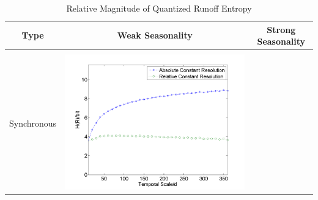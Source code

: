 \documentclass[draft,wrr]{AGUTeX}
\begin{document}
\begin{article}
\begin{table}[H]\small
\caption{Relative Magnitude of Quantized Runoff Entropy}
\resizebox{\textwidth}{!}
{
\label{EN}
\centering
\begin{tabular}{ccc}
\hline
Type& Weak Seasonality & Strong Seasonality \\\hline
\\
Synchronous
&\begin{minipage}{.6\textwidth}\includegraphics[width=\linewidth]{resultgraph/e05585000.png}\end{minipage}


\end{tabular}}
\end{table}
\end{article}
\end{document}
